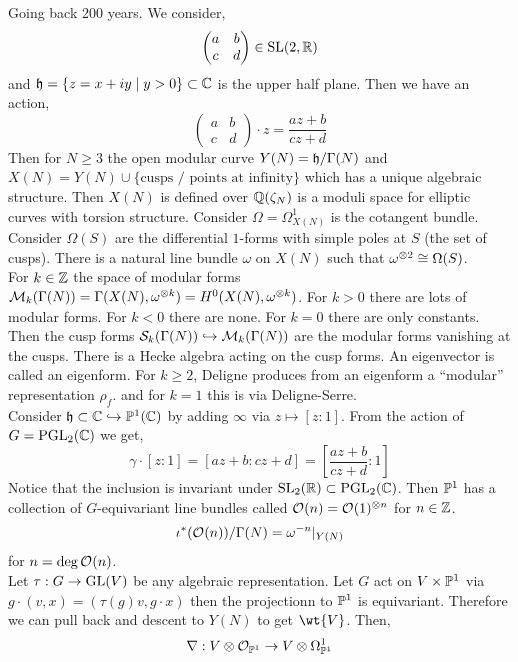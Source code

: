 \documentclass[12pt]{article}
\begin{document}
Going back 200 years. We consider,
\[ \begin{pmatrix}
a & b
\\
c & d
\end{pmatrix}
\in \SL(2, \R) \]
and $\h = \{ z = x + i y \mid y > 0 \} \subset \CC$ is the upper half plane. Then we have an action,
\[ \begin{pmatrix}
a & b
\\
c & d
\end{pmatrix} \cdot z = \frac{a z + b}{c z + d} \]
Then for $N \ge 3$ the open modular curve $Y(N) = \h / \Gamma(N)$ and $X(N) = Y(N) \cup \{ \text{cusps / points at infinity} \}$ which has a unique algebraic structure. Then $X(N)$ is defined over $\Q(\zeta_N)$ is a moduli space for elliptic curves with torsion structure. Consider $\Omega = \Omega^1_{X(N)}$ is the cotangent bundle. Consider $\Omega(S)$ are the differential $1$-forms with simple poles at $S$ (the set of cusps). There is a natural line bundle $\omega$ on $X(N)$ such that $\omega^{\ot 2} \cong \Omega(S)$.
\bigskip\\
For $k \in \Z$ the space of modular forms $\M_k(\Gamma(N)) = \Gamma(X(N), \omega^{\ot k}) = H^0(X(N), \omega^{\ot k})$. For $k > 0$ there are lots of modular forms. For $k < 0$ there are none. For $k = 0$ there are only constants. Then the cusp forms $\cS_k(\Gamma(N)) \embed \M_k(\Gamma(N))$ are the modular forms vanishing at the cusps. There is a Hecke algebra acting on the cusp forms. An eigenvector is called an eigenform. For $k \ge 2$, Deligne produces from an eigenform a ``modular'' representation $\rho_f$. and for $k = 1$ this is via Deligne-Serre.
\bigskip\\
Consider $\h \subset \CC \embed \P^1(\CC)$ by adding $\infty$ via $z \mapsto [z : 1]$. From the action of $G = \PGL_2(\CC)$ we get,
\[ \gamma \cdot [z : 1] = [az + b : c z + d] = \left[ \frac{az + b}{cz + d} : 1 \right] \]
Notice that the inclusion is invariant under $\SL_2(\RR) \subset \PGL_2(\CC)$. 
Then $\P^1$ has a collection of $G$-equivariant line bundles called $\struct{}(n) = \struct{}(1)^{\ot n}$ for $n \in \ZZ$.    
\[ \iota^* (\struct{}(n)) / \Gamma(N) = \omega^{-n} |_{Y(N)} \]
for $n = \deg{\struct{}(n)}$. 
\bigskip\\
Let $\tau : G \to \GL(V)$ be any algebraic representation. Let $G$ act on $V \times \P^1$ via $g \cdot (v, x) = (\tau(g) v, g \cdot x)$ then the projectionn to $\P^1$ is equivariant. Therefore we can pull back and descent to $Y(N)$ to get $\wt{V}$. Then,
\[ \nabla : V \ot \struct{\P^1} \to V \ot \Omega^1_{\P^1} \]
\end{document}
